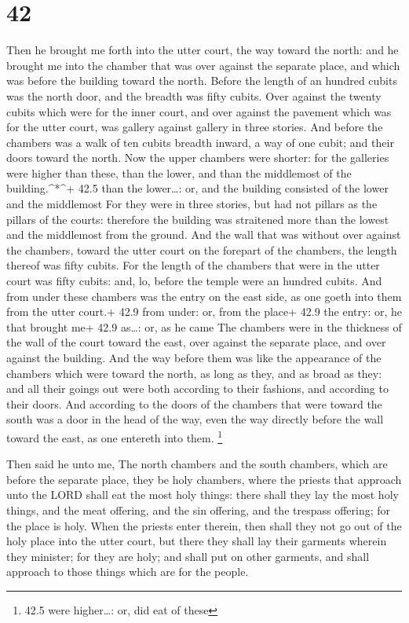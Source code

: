 \hypertarget{section-41}{%
\section{42}\label{section-41}}

 Then he brought me forth into the utter court, the way
toward the north: and he brought me into the chamber that was over
against the separate place, and which was before the building toward the
north.  Before the length of an hundred cubits was the north
door, and the breadth was fifty cubits.  Over against the
twenty cubits which were for the inner court, and over against the
pavement which was for the utter court, was gallery against gallery in
three stories.  And before the chambers was a walk of ten
cubits breadth inward, a way of one cubit; and their doors toward the
north.  Now the upper chambers were shorter: for the
galleries were higher than these, than the lower, and than the
middlemost of the building.\^{}*\^{}+ 42.5 than the lower\ldots: or, and
the building consisted of the lower and the middlemost  For
they were in three stories, but had not pillars as the pillars of the
courts: therefore the building was straitened more than the lowest and
the middlemost from the ground.  And the wall that was
without over against the chambers, toward the utter court on the
forepart of the chambers, the length thereof was fifty cubits.
 For the length of the chambers that were in the utter court
was fifty cubits: and, lo, before the temple were an hundred cubits.
 And from under these chambers was the entry on the east
side, as one goeth into them from the utter court.+ 42.9 from under: or,
from the place+ 42.9 the entry: or, he that brought me+ 42.9 as\ldots:
or, as he came  The chambers were in the thickness of the
wall of the court toward the east, over against the separate place, and
over against the building.  And the way before them was
like the appearance of the chambers which were toward the north, as long
as they, and as broad as they: and all their goings out were both
according to their fashions, and according to their doors. 
And according to the doors of the chambers that were toward the south
was a door in the head of the way, even the way directly before the wall
toward the east, as one entereth into them. \footnote{42.5 were
  higher\ldots: or, did eat of these}

 Then said he unto me, The north chambers and the south
chambers, which are before the separate place, they be holy chambers,
where the priests that approach unto the LORD shall eat the most holy
things: there shall they lay the most holy things, and the meat
offering, and the sin offering, and the trespass offering; for the place
is holy.  When the priests enter therein, then shall they
not go out of the holy place into the utter court, but there they shall
lay their garments wherein they minister; for they are holy; and shall
put on other garments, and shall approach to those things which are for
the people.

